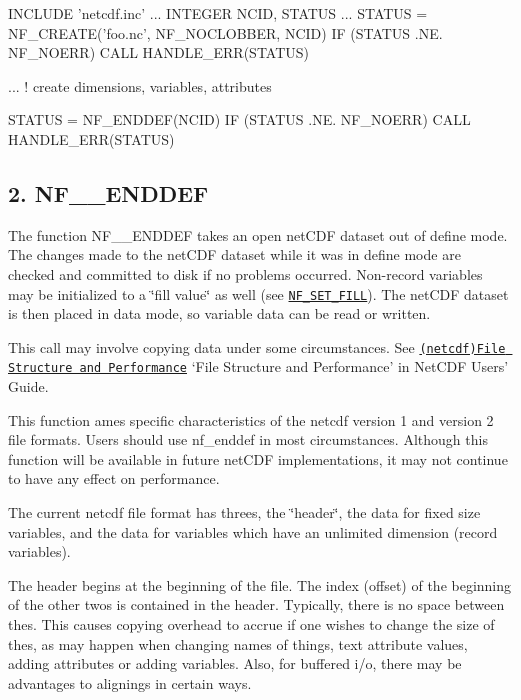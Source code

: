 \begin{DoxyCode}
INCLUDE 'netcdf.inc'
   ...
INTEGER NCID, STATUS
   ...
STATUS = NF\_CREATE('foo.nc', NF\_NOCLOBBER, NCID)
IF (STATUS .NE. NF\_NOERR) CALL HANDLE\_ERR(STATUS)

   ...   ! create dimensions, variables, attributes

STATUS = NF\_ENDDEF(NCID)
IF (STATUS .NE. NF\_NOERR) CALL HANDLE\_ERR(STATUS)
\end{DoxyCode}
\hypertarget{nc_f77_interface_guide_f77_NF__ENDDEF}{}\subsection{2. N\+F\+\_\+\+\_\+\+E\+N\+D\+D\+E\+F }\label{nc_f77_interface_guide_f77_NF__ENDDEF}
The function N\+F\+\_\+\+\_\+\+E\+N\+D\+D\+EF takes an open net\+C\+DF dataset out of define mode. The changes made to the net\+C\+DF dataset while it was in define mode are checked and committed to disk if no problems occurred. Non-\/record variables may be initialized to a \char`\"{}fill value\char`\"{} as well (see \href{#NF_005fSET_005fFILL}{\tt N\+F\+\_\+\+S\+E\+T\+\_\+\+F\+I\+LL}). The net\+C\+DF dataset is then placed in data mode, so variable data can be read or written.

This call may involve copying data under some circumstances. See \href{netcdf.html#File-Structure-and-Performance}{\tt (netcdf)File Structure and Performance} ‘\+File Structure and Performance’ in Net\+C\+DF Users’ Guide.

This function ames specific characteristics of the netcdf version 1 and version 2 file formats. Users should use nf\+\_\+enddef in most circumstances. Although this function will be available in future net\+C\+DF implementations, it may not continue to have any effect on performance.

The current netcdf file format has threes, the \char`\"{}header\char`\"{}, the data for fixed size variables, and the data for variables which have an unlimited dimension (record variables).

The header begins at the beginning of the file. The index (offset) of the beginning of the other twos is contained in the header. Typically, there is no space between thes. This causes copying overhead to accrue if one wishes to change the size of thes, as may happen when changing names of things, text attribute values, adding attributes or adding variables. Also, for buffered i/o, there may be advantages to alignings in certain ways.

